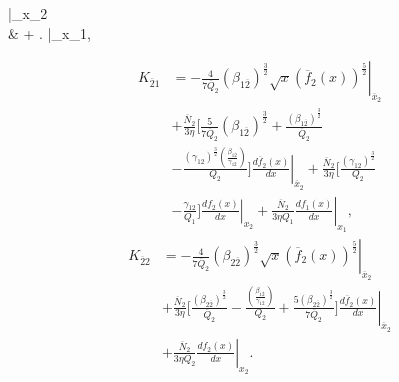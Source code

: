 \documentclass[final,3p,times,twocolumn]{elsarticle}
\begin{document}
\right|_{x_2} \\ & + \left.   \right|_{x_1},
            
            \begin{equation}
                \begin{split}
                    K_{\overline{2}1}  &= -  \left.\frac{4}{7\overline{Q}_{2}} (\beta_{1\overline{2}})^\frac{3}{2} \sqrt{x} (\overline{f}_{2}(x))^\frac{5}{2} \right|_{\overline{x}_{2}} \\ & + \frac{\overline{N}_{2}}{3 \eta} \Biggl[ \frac{5}{7 \overline{Q}_{2}} (\beta_{1\overline{2}})^\frac{3}{2}+ \frac{(\beta_{1\overline{2}})^\frac{3}{2}}{\overline{Q}_{2}} \\ & - \frac{(\gamma_{12})^\frac{3}{2} \left(\frac{\beta_{1\overline{2}}}{\gamma_{12}}\right)}{Q_{2}} \Biggr] \left. \frac{d\overline{f}_{2}(x)}{dx}\right|_{\overline{x}_{2}}   +   \frac{\overline{N}_{2}}{3 \eta}  \Biggl[\frac{(\gamma_{12})^\frac{3}{2}}{Q_2} \\ & - \left. \frac{\gamma_{12}}{Q_1} \Biggr] \frac{df_2(x)}{dx} \right|_{x_2}  + \left. \frac{\overline{N}_{2}}{3 \eta Q_1} \frac{df_1(x)}{dx} \right|_{x_1},
                \end{split}
            \label{eqn:k2bar1_caseI}
            \end{equation}       
            \begin{equation}
            \begin{split}
            K_{\overline{2}2} &= - \left. \frac{4}{7\overline{Q}_{2}}(\beta_{2\overline{2}})^\frac{3}{2}\sqrt{x}(\overline{f}_{2}(x))^\frac{5}{2}\right|_{\overline{x}_{2}} \\ & +\frac{\overline{N}_{2}}{3\eta} \biggl[\frac{(\beta_{2\overline{2}})^\frac{3}{2}}{\overline{Q}_{2}}-\frac{\left(\frac{\beta_{1\overline{2}}}{\gamma_{12}}\right)}{Q_2} +\left. \frac{5(\beta_{2\overline{2}})^\frac{3}{2}}{7\overline{Q}_{2}}\biggr]\frac{d\overline{f}_{2}(x)}{dx}\right|_{\overline{x}_{2}} \\ & + \left. \frac{\overline{N}_{2}}{3\eta Q_2} \frac{df_2(x)}{dx}\right|_{x_2}.
            \label{eqn:k2bar2_caseI}
            \end{split}
            \end{equation} 
\label{app1}








            
\end{document}
